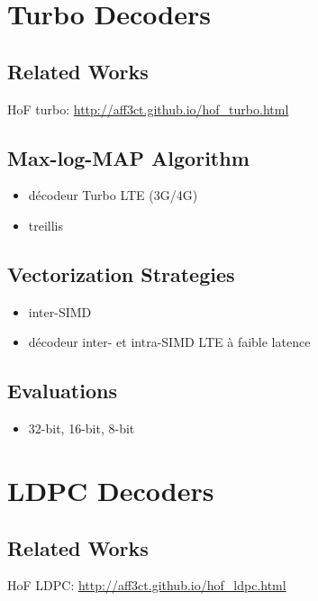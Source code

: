 \section{Turbo Decoders~\cite{Cassagne2016a}}

\subsection{Related Works}

HoF turbo: \url{http://aff3ct.github.io/hof_turbo.html}

\subsection{Max-log-MAP Algorithm}

\begin{itemize}
  \item décodeur Turbo LTE (3G/4G)
  \item treillis
\end{itemize}

\subsection{Vectorization Strategies}

\begin{itemize}
  \item inter-SIMD
  \item décodeur inter- et intra-SIMD LTE à faible latence
\end{itemize}

\subsection{Evaluations}

\begin{itemize}
  \item 32-bit, 16-bit, 8-bit
\end{itemize}

\section{LDPC Decoders}

\subsection{Related Works}

HoF LDPC: \url{http://aff3ct.github.io/hof_ldpc.html}

